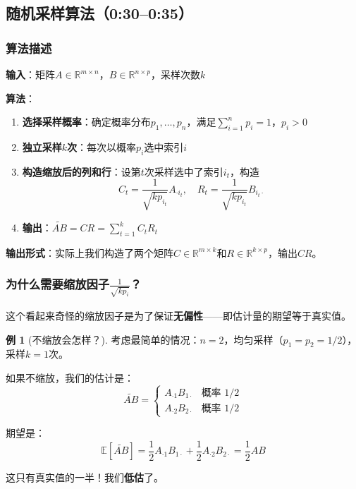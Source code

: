 \documentclass[11pt,a4paper]{ctexart}
\theoremstyle{definition}
\newtheorem{example}[theorem]{例}
\theoremstyle{remark}
\begin{document}
\subsection{随机采样算法（0:30--0:35）}

\subsubsection{算法描述}

\textbf{输入}：矩阵$A \in \mathbb{R}^{m \times n}$，$B \in \mathbb{R}^{n \times p}$，采样次数$k$

\textbf{算法}：
\begin{enumerate}
    \item \textbf{选择采样概率}：确定概率分布$p_1, \ldots, p_n$，满足$\sum_{i=1}^n p_i = 1$，$p_i > 0$
    \item \textbf{独立采样$k$次}：每次以概率$p_i$选中索引$i$
    \item \textbf{构造缩放后的列和行}：设第$t$次采样选中了索引$i_t$，构造
    \[
    C_t = \frac{1}{\sqrt{k p_{i_t}}} A_{\cdot i_t}, \quad R_t = \frac{1}{\sqrt{k p_{i_t}}} B_{i_t \cdot}
    \]
    \item \textbf{输出}：$\widetilde{AB} = CR = \sum_{t=1}^k C_t R_t$
\end{enumerate}

\textbf{输出形式}：实际上我们构造了两个矩阵$C \in \mathbb{R}^{m \times k}$和$R \in \mathbb{R}^{k \times p}$，输出$CR$。

\subsubsection{为什么需要缩放因子$\frac{1}{\sqrt{kp_i}}$？}

这个看起来奇怪的缩放因子是为了保证\textbf{无偏性}——即估计量的期望等于真实值。

\begin{example}[不缩放会怎样？]
考虑最简单的情况：$n=2$，均匀采样（$p_1 = p_2 = 1/2$），采样$k=1$次。

如果不缩放，我们的估计是：
\[
\widetilde{AB} = \begin{cases}
A_{\cdot 1} B_{1 \cdot} & \text{概率 } 1/2 \\
A_{\cdot 2} B_{2 \cdot} & \text{概率 } 1/2
\end{cases}
\]

期望是：
\[
\mathbb{E}[\widetilde{AB}] = \frac{1}{2} A_{\cdot 1} B_{1 \cdot} + \frac{1}{2} A_{\cdot 2} B_{2 \cdot} = \frac{1}{2} AB
\]

这只有真实值的一半！我们\textbf{低估}了。
\end{example}
\end{document}

